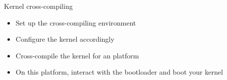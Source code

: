 \setuplabframe
{Kernel cross-compiling}
{
  \begin{itemize}
  \item Set up the cross-compiling environment
  \item Configure the kernel  accordingly
  \item Cross-compile the kernel for an  platform
  \item On this platform, interact with the bootloader and boot your
    kernel
  \end{itemize}
}
